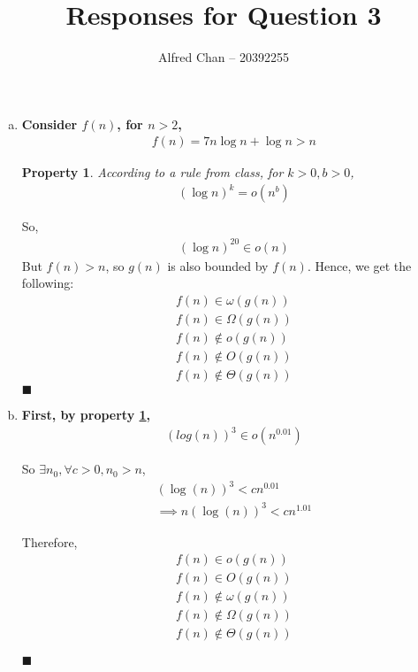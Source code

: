 \documentclass[12pt]{article}
\title{Responses for Question 3}
\author{Alfred Chan -- 20392255}
\begin{document}
\maketitle

\newtheorem{property}{Property}
\begin{enumerate}[a.]
\item
{\bf
Consider $f(n)$, for $n>2$,
\begin{gather*}
f(n) = 7n\log n+\log n > n
\end{gather*}

\begin{property}\label{prop:log<exp}
According to a rule from class, for $k>0,b>0$,
\begin{gather*}
(\log n)^k = o(n^b)
\end{gather*}
\end{property}

So,
\begin{gather*}
(\log n)^{20} \in o(n)
\end{gather*}
But $f(n) > n$, so $g(n)$ is also bounded by $f(n)$. Hence, we get the following:
\begin{gather*}
f(n) \in \omega(g(n))\\
f(n) \in \Omega(g(n))\\
f(n) \notin o(g(n))\\
f(n) \notin O(g(n))\\
f(n) \notin \Theta(g(n))
\end{gather*}
\hfill $\blacksquare$
}

\item
{\bf
First, by property \ref{prop:log<exp},
\begin{gather*}
(log(n))^3 \in o(n^{0.01})
\end{gather*}

So $\exists n_0, \forall c>0, n_0 > n$,
\begin{gather*}
(\log(n))^3 < c n^{0.01}\\
\implies n(\log(n))^3 < c n^{1.01}
\end{gather*}

Therefore,
\begin{gather*}
f(n) \in o(g(n))\\
f(n) \in O(g(n))\\
f(n) \notin \omega(g(n))\\
f(n) \notin \Omega(g(n))\\
f(n) \notin \Theta(g(n))
\end{gather*}

\hfill $\blacksquare$
}


\end{enumerate}
\end{document}
